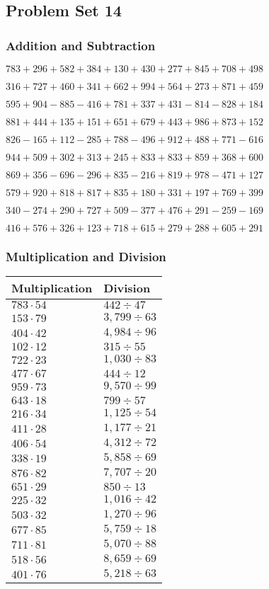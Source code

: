 \hypertarget{problem-set-14-2}{%
\subsection{Problem Set 14}\label{problem-set-14-2}}

\hypertarget{addition-and-subtraction-114}{%
\subsubsection{Addition and
Subtraction}\label{addition-and-subtraction-114}}

\(783 + 296 + 582 + 384 + 130 + 430 + 277 + 845 + 708 + 498\)

\(316 + 727 + 460 + 341 + 662 + 994 + 564 + 273 + 871 + 459\)

\(595 + 904 - 885 - 416 + 781 + 337 + 431 - 814 - 828 + 184\)

\(881 + 444 + 135 + 151 + 651 + 679 + 443 + 986 + 873 + 152\)

\(826 - 165 + 112 - 285 + 788 - 496 + 912 + 488 + 771 - 616\)

\(944 + 509 + 302 + 313 + 245 + 833 + 833 + 859 + 368 + 600\)

\(869 + 356 - 696 - 296 + 835 - 216 + 819 + 978 - 471 + 127\)

\(579 + 920 + 818 + 817 + 835 + 180 + 331 + 197 + 769 + 399\)

\(340 - 274 + 290 + 727 + 509 - 377 + 476 + 291 - 259 - 169\)

\(416 + 576 + 326 + 123 + 718 + 615 + 279 + 288 + 605 + 291\)

\hypertarget{multiplication-and-division-114}{%
\subsubsection{Multiplication and
Division}\label{multiplication-and-division-114}}

\begin{longtable}[]{@{}ll@{}}
\toprule
Multiplication & Division\tabularnewline
\midrule
\endhead
\(783 \cdot 54\) & \(442÷47\)\tabularnewline
\(153 \cdot 79\) & \(3,799÷63\)\tabularnewline
\(404 \cdot 42\) & \(4,984÷96\)\tabularnewline
\(102 \cdot 12\) & \(315÷55\)\tabularnewline
\(722 \cdot 23\) & \(1,030÷83\)\tabularnewline
\(477 \cdot 67\) & \(444÷12\)\tabularnewline
\(959 \cdot 73\) & \(9,570÷99\)\tabularnewline
\(643 \cdot 18\) & \(799÷57\)\tabularnewline
\(216 \cdot 34\) & \(1,125÷54\)\tabularnewline
\(411 \cdot 28\) & \(1,177÷21\)\tabularnewline
\(406 \cdot 54\) & \(4,312÷72\)\tabularnewline
\(338 \cdot 19\) & \(5,858÷69\)\tabularnewline
\(876 \cdot 82\) & \(7,707÷20\)\tabularnewline
\(651 \cdot 29\) & \(850÷13\)\tabularnewline
\(225 \cdot 32\) & \(1,016÷42\)\tabularnewline
\(503 \cdot 32\) & \(1,270÷96\)\tabularnewline
\(677 \cdot 85\) & \(5,759÷18\)\tabularnewline
\(711 \cdot 81\) & \(5,070÷88\)\tabularnewline
\(518 \cdot 56\) & \(8,659÷69\)\tabularnewline
\(401 \cdot 76\) & \(5,218÷63\)\tabularnewline
\bottomrule
\end{longtable}

